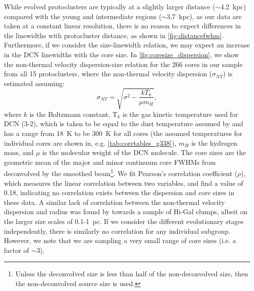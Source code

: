 \documentclass[longauth]{aa} %
\begin{document}
While evolved protoclusters are typically at a slightly larger distance ($\sim$4.2~kpc) compared with the young and intermediate regions ($\sim$3.7~kpc), as our data are taken at a constant linear resolution, there is no reason to expect differences in the linewidths with protocluster distance, as shown in \cref{fig:distancefwhm}. 
Furthermore, if we consider the size-linewidth relation, we may expect an increase in the DCN linewidths with the core size. In \cref{fig:coresize_dispersion}, we show the non-thermal velocity dispersion-size relation for the 266 cores in our sample from all 15 protoclusters, where the non-thermal velocity dispersion ($\sigma_{NT}$) is estimated assuming:
\begin{equation}
 \label{eq:thermaldisp}
 \sigma_{NT} = \sqrt{\sigma^2 - \frac{kT_{k}}{\mu m_H}},
 \nonumber
\end{equation}
where  $k$ is the Boltzmann constant, T$_{k}$ is the gas kinetic temperature used for DCN (3-2), which is taken to be equal to the dust temperature assumed by \citet{louvet22} and has a range from 18~K to be 300~K for all cores (the assumed temperatures for individual cores are shown in, e.g. \cref{tab:coretables_g338}), $m_H$ is the hydrogen mass, and $\mu$ is the molecular weight of the DCN molecule. The core sizes are the geometric mean of the major and minor continuum core FWHMs from \citet{louvet22} deconvolved by the smoothed beam\footnote{Unless the deconvolved size is less than half of the non-deconvolved size, then the non-deconvolved source size is used.}.
We fit Pearson's correlation coefficient ($\rho$), which measures the linear correlation between two variables, and find a value of 0.18, indicating no correlation exists between the dispersion and core sizes in these data. A similar lack of correlation between the non-thermal velocity dispersion and radius was found by \citet{Traficante2018} towards a sample of Hi-Gal clumps, albeit on the larger size scales of 0.1-1~pc. If we consider the different evolutionary stages independently, there is similarly no correlation for any individual subgroup. However, we note that we are sampling a very small range of core sizes (i.e. a factor of $\sim$3). 
\end{document}

